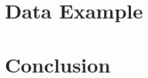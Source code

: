 \documentclass{article}
\begin{document}
\section{Data Example}

\section{Conclusion}
\end{document}
